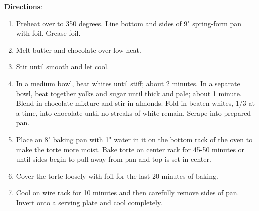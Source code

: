\documentclass[11pt, twoside, openany]{book}
\begin{document}
\textbf{Directions}:
\vspace{-3mm}\begin{enumerate}\setlength\itemsep{-1mm}
\item Preheat over to 350 degrees. Line bottom and sides of 9" spring-form pan with foil. Grease foil.
\item Melt butter and chocolate over low heat.
\item Stir until smooth and let cool.
\item In a medium bowl, beat whites until stiff; about 2 minutes. In a separate bowl, beat together yolks and sugar until thick and pale; about 1 minute. Blend in chocolate mixture and stir in almonds. Fold in beaten whites, 1/3 at a time, into chocolate until no streaks of white remain. Scrape into prepared pan.
\item Place an 8" baking pan with 1" water in it on the bottom rack of the oven to make the torte more moist. Bake torte on center rack for 45-50 minutes or until sides begin to pull away from pan and top is set in center.
\item Cover the torte loosely with foil for the last 20 minutes of baking.
\item Cool on wire rack for 10 minutes and then carefully remove sides of pan. Invert onto a serving plate and cool completely.
\end{enumerate}
 \label{p.-f.-chang's-chicken-lettuce-wraps}\hfill\textit{}\\
\end{document}
